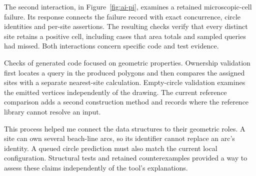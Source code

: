 The second interaction, in Figure~\ref{fig:ai-pi}, examines a retained microscopic-cell failure. Its response connects the failure record with exact concurrence, circle identities and per-site assertions. The resulting checks verify that every distinct site retains a positive cell, including cases that area totals and sampled queries had missed. Both interactions concern specific code and test evidence.

Checks of generated code focused on geometric properties. Ownership validation first locates a query in the produced polygons and then compares the assigned sites with a separate nearest-site calculation. Empty-circle validation examines the emitted vertices independently of the drawing. The current reference comparison adds a second construction method and records where the reference library cannot resolve an input.

This process helped me connect the data structures to their geometric roles. A site can own several beach-line arcs, so its identifier cannot replace an arc's identity. A queued circle prediction must also match the current local configuration. Structural tests and retained counterexamples provided a way to assess these claims independently of the tool's explanations.
